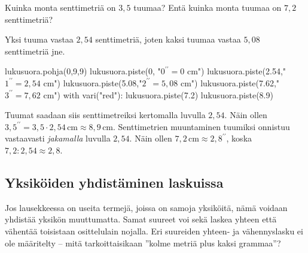 \begin{esimerkki}
Kuinka monta senttimetriä on $3,5$ tuumaa? Entä kuinka monta tuumaa on $7,2$ senttimetriä?
	\begin{esimratk}
Yksi tuuma vastaa $2,54$ senttimetriä, joten kaksi tuumaa vastaa $5,08$ senttimetriä jne.
	
\begin{kuva}
	lukusuora.pohja(0,9,9)
	lukusuora.piste(0, "$0^{\prime \prime} = 0 $ cm")
	lukusuora.piste(2.54,"$1^{\prime \prime} = 2,54$ cm")
	lukusuora.piste(5.08,"$2^{\prime \prime} = 5,08$ cm")
	lukusuora.piste(7.62,"$3^{\prime \prime} = 7,62$ cm")
	with vari("red"):
	  lukusuora.piste(7.2)
	  lukusuora.piste(8.9)
\end{kuva}

Tuumat saadaan siis senttimetreiksi kertomalla luvulla $2,54$. Näin ollen $3,5^{\prime \prime} = 3,5 \cdot 2,54\,\textrm{cm} \approx 8,9\,$cm. Senttimetrien muuntaminen tuumiksi onnistuu vastaavasti \emph{jakamalla} luvulla $2,54$. Näin ollen $7,2\,\textrm{cm} \approx 2,8^{\prime \prime}$, koska $7,2:2,54 \approx 2,8$.
	\end{esimratk}
\end{esimerkki}





\subsection{Yksiköiden yhdistäminen laskuissa}

Jos lausekkeessa on useita termejä, joissa on samoja yksiköitä, nämä voidaan yhdistää yksikön muuttumatta. Samat suureet voi sekä laskea yhteen että vähentää toisistaan osittelulain nojalla. Eri suureiden yhteen- ja vähennyslasku ei ole määritelty -- mitä tarkoittaisikaan ''kolme metriä plus kaksi grammaa''?

